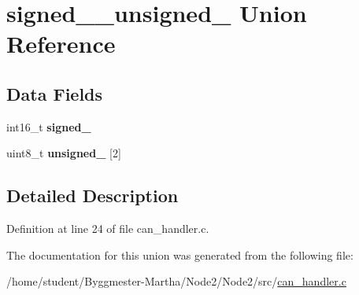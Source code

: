 \hypertarget{unionsigned__16__unsigned__8}{}\section{signed\+\_\+\_\+unsigned\+\_ Union Reference}
\label{unionsigned__16__unsigned__8}
\subsection*{Data Fields}
\begin{DoxyCompactItemize}
\item 
\mbox{\label{unionsigned__16__unsigned__8_ae0f653c9792eb38b422c7902fb29ca38}} 
int16\+\_\+t {\bfseries signed\+\_}
\item 
\mbox{\label{unionsigned__16__unsigned__8_a5565871afadcc4dbfded539cbf4362fd}} 
uint8\+\_\+t {\bfseries unsigned\+\_} \mbox{[}2\mbox{]}
\end{DoxyCompactItemize}


\subsection{Detailed Description}


Definition at line 24 of file can\+\_\+handler.\+c.



The documentation for this union was generated from the following file\+:\begin{DoxyCompactItemize}
\item 
/home/student/\+Byggmester-\/\+Martha/\+Node2/\+Node2/src/\hyperlink{can__handler_8c}{can\+\_\+handler.\+c}\end{DoxyCompactItemize}
